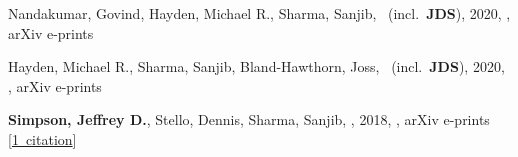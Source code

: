 \item[{\color{numcolor}\scriptsize3}] Nandakumar, Govind, Hayden, Michael R., Sharma, Sanjib, \etal\ (incl.\ \textbf{JDS}), 2020, , arXiv e-prints

\item[{\color{numcolor}\scriptsize2}] Hayden, Michael R., Sharma, Sanjib, Bland-Hawthorn, Joss, \etal\ (incl.\ \textbf{JDS}), 2020, , arXiv e-prints

\item[{\color{numcolor}\scriptsize1}] \textbf{Simpson, Jeffrey D.}, Stello, Dennis, Sharma, Sanjib, \etal, 2018, , arXiv e-prints [\href{https://ui.adsabs.harvard.edu/#abs/2018arXiv180405900S}{1~citation}]